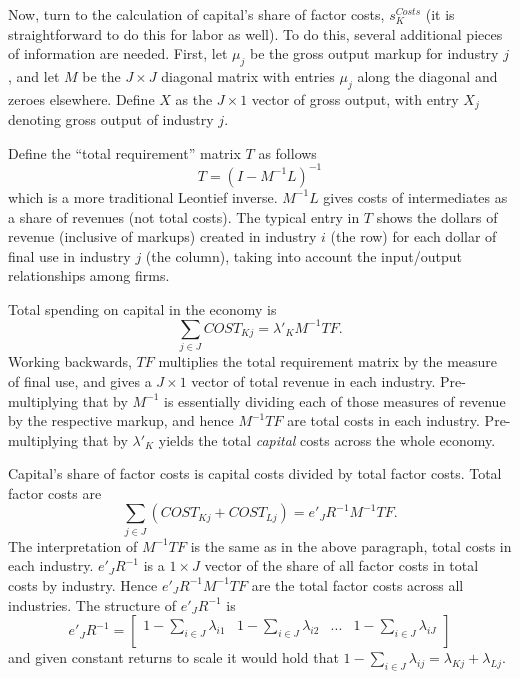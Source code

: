 \documentclass[11pt]{article}
\begin{document}
Now, turn to the calculation of capital's share of factor costs, $s_K^{Costs}$ (it is straightforward to do this for labor as well). To do this, several additional pieces of information are needed. First, let $\mu_j$ be the gross output markup for industry $j$, and let $M$ be the $J \times J$ diagonal matrix with entries $\mu_j$ along the diagonal and zeroes elsewhere. Define $X$ as the $J \times 1$ vector of gross output, with entry $X_j$ denoting gross output of industry $j$. 

Define the ``total requirement'' matrix $T$ as follows
\begin{equation}
	T = (I - M^{-1}L)^{-1}
\end{equation}
which is a more traditional Leontief inverse. $M^{-1}L$ gives costs of intermediates as a share of revenues (not total costs). The typical entry in $T$ shows the dollars of revenue (inclusive of markups) created in industry $i$ (the row) for each dollar of final use in industry $j$ (the column), taking into account the input/output relationships among firms.

Total spending on capital in the economy is
\begin{equation}
	\sum_{j \in J} COST_{Kj} = \lambda'_K M^{-1} T F. 
\end{equation}
Working backwards, $T F$ multiplies the total requirement matrix by the measure of final use, and gives a $J \times 1$ vector of total revenue in each industry. Pre-multiplying that by $M^{-1}$ is essentially dividing each of those measures of revenue by the respective markup, and hence $M^{-1} T F$ are total costs in each industry. Pre-multiplying that by $\lambda'_K$ yields the total \textit{capital} costs across the whole economy. 

Capital's share of factor costs is capital costs divided by total factor costs. Total factor costs are
\begin{equation}
	\sum_{j \in J} (COST_{Kj}+COST_{Lj}) = e'_J R^{-1} M^{-1} T F. 
\end{equation}
The interpretation of $M^{-1} T F$ is the same as in the above paragraph, total costs in each industry. $e'_J R^{-1}$ is a $1 \times J$ vector of the share of all factor costs in total costs by industry. Hence $e'_J R^{-1} M^{-1} T F$ are the total factor costs across all industries. The structure of $e'_J R^{-1}$ is
\begin{equation}
	e'_J R^{-1} = \begin{bmatrix}
		1 - \sum_{i \in J} \lambda_{i1} & 1 - \sum_{i \in J} \lambda_{i2} & ... & 1 - \sum_{i \in J} \lambda_{iJ}  \\
	\end{bmatrix}
\end{equation}
and given constant returns to scale it would hold that $1 - \sum_{i \in J} \lambda_{ij} = \lambda_{Kj} + \lambda_{Lj}$. 
\end{document}
